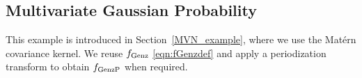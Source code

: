 \documentclass{svjour3}                     %
\newcommand{\hmu}{\widehat{\mu}}
\newcommand{\code}[1]{\texttt{#1}}
\def\abs#1{\ensuremath{\left \lvert #1 \right \rvert}}
\begin{document}


\subsection{Multivariate Gaussian Probability}

This example is introduced in Section~\ref{MVN_example}, where we use the Mat\'ern covariance kernel.  We reuse $f_{\textup{Genz}}$ \eqref{eqn:fGenzdef} and apply a periodization transform to obtain $f_{\textup{GenzP}}$ when required.
\end{document}
